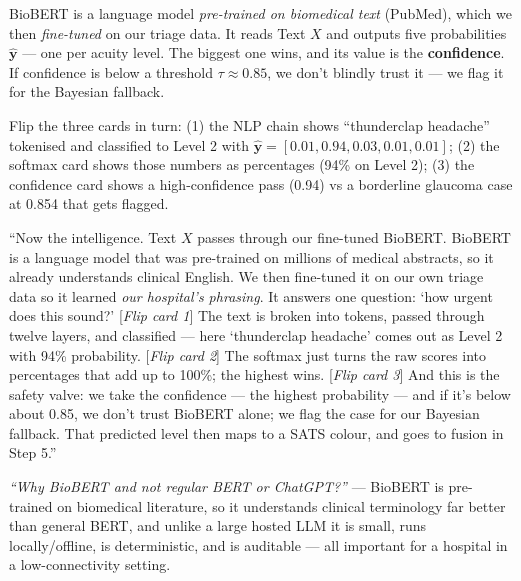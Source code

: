 \documentclass[11pt]{article}
\begin{document}
\begin{idea}
BioBERT is a language model \emph{pre-trained on biomedical text} (PubMed), which we then \emph{fine-tuned}
on our triage data. It reads Text $X$ and outputs five probabilities $\hat{\mathbf{y}}$ --- one per acuity
level. The biggest one wins, and its value is the \textbf{confidence}. If confidence is below a threshold
$\tau \approx 0.85$, we don't blindly trust it --- we flag it for the Bayesian fallback.
\end{idea}

\begin{demo}
Flip the three cards in turn: (1) the NLP chain shows ``thunderclap headache'' tokenised and classified to
Level 2 with $\hat{\mathbf{y}} = [0.01, 0.94, 0.03, 0.01, 0.01]$; (2) the softmax card shows those numbers
as percentages (94\% on Level 2); (3) the confidence card shows a high-confidence pass (0.94) vs a
borderline glaucoma case at 0.854 that gets flagged.
\end{demo}

\begin{saybox}
``Now the intelligence. Text $X$ passes through our fine-tuned BioBERT. BioBERT is a language model that
was pre-trained on millions of medical abstracts, so it already understands clinical English. We then
fine-tuned it on our own triage data so it learned \emph{our hospital's phrasing}. It answers one
question: `how urgent does this sound?' [\emph{Flip card 1}] The text is broken into tokens, passed
through twelve layers, and classified --- here `thunderclap headache' comes out as Level 2 with 94\%
probability. [\emph{Flip card 2}] The softmax just turns the raw scores into percentages that add up to
100\%; the highest wins. [\emph{Flip card 3}] And this is the safety valve: we take the confidence ---
the highest probability --- and if it's below about 0.85, we don't trust BioBERT alone; we flag the case
for our Bayesian fallback. That predicted level then maps to a SATS colour, and goes to fusion in Step 5.''
\end{saybox}

\begin{qabox}
\textit{``Why BioBERT and not regular BERT or ChatGPT?''} --- BioBERT is pre-trained on biomedical
literature, so it understands clinical terminology far better than general BERT, and unlike a large
hosted LLM it is small, runs locally/offline, is deterministic, and is auditable --- all important for a
hospital in a low-connectivity setting.
\end{qabox}
\end{document}
